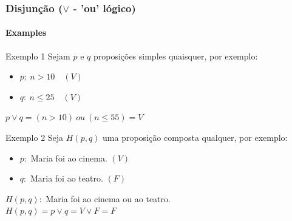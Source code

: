 \documentclass[10pt, headsepline, captions=tableabove,xcolor=table]{beamer}
\begin{document}
%
\begin{frame}[t]
    \frametitle{Disjunção ($\lor$ - 'ou' lógico)}
    \framesubtitle{Examples}
    \begin{exampleblock}{Exemplo 1}
        Sejam $p$ e $q$ proposições simples quaisquer, por exemplo:
        \begin{itemize}
            \item $p:~n > 10 \quad (V)$
            \item $q:~n \leq 25 \quad (V)$
        \end{itemize}
        $p \lor q = (n >10)~ou~(n \leq 55) = V$ \\[2pt]
    \end{exampleblock}
    \begin{exampleblock}{Exemplo 2}
        Seja $H(p,q)$ uma proposição composta qualquer, por exemplo:
        \begin{itemize}
            \item $p:$ Maria foi ao cinema. $(V)$
            \item $q:$ Maria foi ao teatro. $(F)$
        \end{itemize}
        $H(p,q):$ Maria foi ao cinema ou ao teatro. \\[2pt]
        $H(p,q) = p \lor q = V \lor F = F$
    \end{exampleblock}
\end{frame}
%
\end{document}
